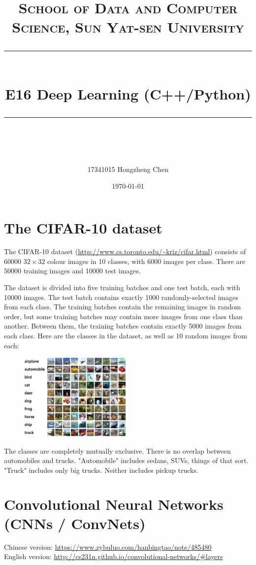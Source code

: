 \documentclass[a4paper, 11pt]{article}
\title{
\normalfont \normalsize
\textsc{School of Data and Computer Science, Sun Yat-sen University} \\ [25pt] %
\rule{\textwidth}{0.5pt} \\[0.4cm] %
\huge  E16 Deep Learning (C++/Python)\\ %
\rule{\textwidth}{2pt} \\[0.5cm] %
\author{17341015 Hongzheng Chen}
\date{\normalsize\today}
}
\begin{document}
\maketitle
\tableofcontents
\newpage
\section{The CIFAR-10 dataset}
The CIFAR-10 dataset (\url{http://www.cs.toronto.edu/~kriz/cifar.html}) consists of 60000 $32\times 32$ colour images in 10 classes, with 6000 images per class. There are 50000 training images and 10000 test images.

The dataset is divided into five training batches and one test batch, each with 10000 images. The test batch contains exactly 1000 randomly-selected images from each class. The training batches contain the remaining images in random order, but some training batches may contain more images from one class than another. Between them, the training batches contain exactly 5000 images from each class. Here are the classes in the dataset, as well as 10 random images from each:
\begin{figure}[H]
\centering
\includegraphics[width=0.5\textwidth]{fig/cifar}
\end{figure}

The classes are completely mutually exclusive. There is no overlap between automobiles and trucks. "Automobile" includes sedans, SUVs, things of that sort. "Truck" includes only big trucks. Neither includes pickup trucks.
\section{Convolutional Neural Networks (CNNs / ConvNets)}
Chinese version: \url{https://www.zybuluo.com/hanbingtao/note/485480}\\
English version: \url{http://cs231n.github.io/convolutional-networks/#layers}
\end{document}
